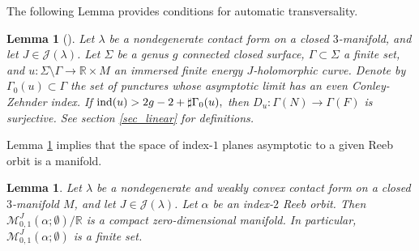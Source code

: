 \documentclass{amsart}
\newcommand{\R}{\mathbb{R}}
\newcommand{\M}{\mathcal{M}}
\newtheorem{lemma}[theorem]{Lemma}
\newcommand{\ind}{\textnormal{ind}}
\begin{document}
The following Lemma provides conditions for automatic transversality. 

\begin{lemma}[{\cite[Lemma 4.1]{HN}}] \label{lem4.1HN}
Let $\lambda$ be a nondegenerate contact form on a closed  $3$-manifold,  and let $J \in \mathcal{J}(\lambda)$. Let $\Sigma$ be a genus $g$ connected closed surface, $\Gamma \subset \Sigma$ a finite set, and $u:\Sigma \setminus \Gamma \to \R \times M$ an immersed finite energy $J$-holomorphic curve. Denote by $\Gamma_0(u)\subset \Gamma$ the set of punctures whose asymptotic limit has an even Conley-Zehnder index. If 
$
    \ind(u)>2g-2+\sharp\Gamma_0(u),
$
then $D_u:\Gamma(N) \to \Gamma(F)$ is surjective. See section \ref{sec_linear} for definitions.
\end{lemma}

 Lemma \ref{lem4.1HN} implies that the space of index-$1$ planes asymptotic to a given Reeb orbit is a manifold. 

\begin{lemma} \label{dim0} 
Let $\lambda$ be a nondegenerate and weakly convex contact form on a closed $3$-manifold $M$, and let $J \in \mathcal{J}(\lambda)$. Let $\alpha$ be an index-$2$ Reeb orbit. Then $\M_{0,1}^J(\alpha; \emptyset)/\R$ is a compact zero-dimensional manifold. In particular, $\M_{0,1}^J(\alpha;\emptyset)$ is a finite set.
\end{lemma}
\end{document}
